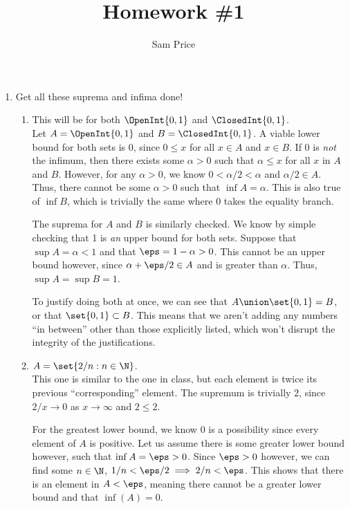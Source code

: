 \documentclass{article}
\author{Sam Price}
\title{Homework \#1}
\begin{document}
\maketitle

\begin{enumerate}

        \item Get all these suprema and infima done!
        \begin{enumerate}

            \item This will be for both $\OpenInt{0, 1}$ and $\ClosedInt{0, 1}$.\\
                Let $A = \OpenInt{0, 1}$ and $B = \ClosedInt{0, 1}$. A viable lower bound for
                both sets is 0, since $0 \le x$ for all $x \in A$ and $x \in B$.
                If 0 is \textit{not} the infimum, then there exists some $\alpha > 0$ such that $\alpha \le x$ for all $x$ in $A$ and $B$.
                However, for any $\alpha > 0$, we know $0 < \alpha/2 < \alpha$ and $\alpha/2 \in A$. Thus, there cannot be some $\alpha > 0$
                such that $\inf A = \alpha$. This is also true of $\inf B$, which is trivially the same where 0 takes the equality branch.

                The suprema for $A$ and $B$ is similarly checked. We know by simple checking that 1 is \textit{an} upper bound for both sets.
                Suppose that $\sup A = \alpha < 1$ and that $\eps = 1 - \alpha > 0$.
                This cannot be an upper bound however, since $\alpha + \eps/2 \in A$ and is greater than $\alpha$.
                Thus, $\sup A = \sup B = 1$.

                To justify doing both at once, we can see that $A \union \set{0, 1} = B$, or that $\set{0, 1} \subset B$.
                This means that we aren't adding any numbers ``in between'' other than those explicitly listed, which won't disrupt the integrity
                of the justifications.

          \item $A = \set{2/n : n \in \N}$.\\
                This one is similar to the one in class, but each element is twice its previous ``corresponding'' element.
                The supremum is trivially 2, since $2/x \to 0$ as $x \to \infty$ and $2 \le 2$.

                For the greatest lower bound, we know 0 is a possibility since every element of $A$ is positive.
                Let us assume there is some greater lower bound however, such that $\inf A = \eps > 0$.
                Since $\eps > 0$ however, we can find some $n \in \N$, $1/n < \eps/2 \implies 2/n < \eps$.
                This shows that there is an element in $A < \eps$, meaning there cannot be a greater lower bound and that $\inf(A) = 0$.


\end{enumerate}
\end{enumerate}
\end{document}

